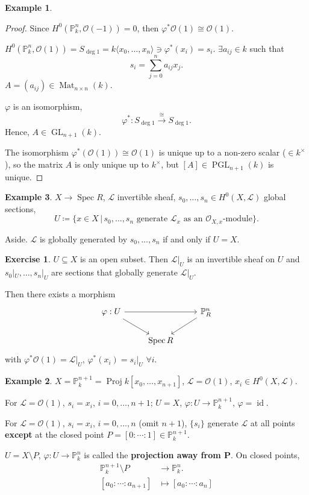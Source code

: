 \documentclass[12pt]{article}
\DeclareMathOperator{\id}{id}
\DeclareMathOperator{\Spec}{Spec}
\DeclareMathOperator{\Proj}{Proj}
\DeclareMathOperator{\GL}{GL}
\DeclareMathOperator{\PGL}{PGL}
\DeclareMathOperator{\Mat}{Mat}
\theoremstyle{definition}
\newtheorem*{exercise}{Exercise}
\newtheorem*{example}{Example}
\begin{document}
\begin{example}
\begin{proof}
Since $H^0(\mathbb P_k^n,\mathcal O(-1))=0$, then $\varphi^*\mathcal O(1)\cong\mathcal O(1)$.

$H^0(\mathbb P_k^n,\mathcal O(1))=S_{\deg1}=k\langle x_0,\ldots,x_n\rangle\ni\varphi^*(x_i)=s_i$. $\exists a_{ij}\in k$ such that
\[s_i=\sum_{j=0}^na_{ij}x_j.\]
$A=(a_{ij})\in\Mat_{n\times n}(k)$.

$\varphi$ is an isomorphism,
\[\varphi^*:S_{\deg1}\overset\cong\longrightarrow S_{\deg1}.\]
Hence, $A\in\GL_{n+1}(k)$.

The isomorphism $\varphi^*(\mathcal O(1))\cong\mathcal O(1)$ is unique up to a non-zero scalar ($\in k^\times$), so the matrix $A$ is only unique up to $k^\times$, but $[A]\in\PGL_{n+1}(k)$ is unique.
\end{proof}
\end{example}

\begin{example}
$X\rightarrow\Spec R$, $\mathcal L$ invertible sheaf, $s_0,\ldots,s_n\in H^0(X,\mathcal L)$ global sections,
\[U\coloneqq\{x\in X\,|\,s_0,\ldots,s_n\text{ generate }\mathcal L_x\text{ as an }\mathcal O_{X,x}\text{-module}\}.\]

Aside. $\mathcal L$ is globally generated by $s_0,\ldots,s_n$ if and only if $U=X$.

\begin{exercise}
$U\subseteq X$ is an open subset. Then $\mathcal L|_U$ is an invertible sheaf on $U$ and $s_0|_U,\ldots,s_n|_U$ are sections that globally generate $\mathcal L|_U$.

Then there exists a morphism
\[\begin{tikzcd}\varphi:U\arrow[rr]\arrow[rd]&&\mathbb P_R^n\arrow[ld]\\&\Spec R\end{tikzcd}\]
with $\varphi^*\mathcal O(1)=\mathcal L|_U$, $\varphi^*(x_i)=s_i|_U$ $\forall i$.
\end{exercise}

\begin{example}
$X=\mathbb P_k^{n+1}=\Proj k[x_0,\ldots,x_{n+1}]$, $\mathcal L=\mathcal O(1)$, $x_i\in H^0(X,\mathcal L)$.

For $\mathcal L=\mathcal O(1)$, $s_i=x_i$, $i=0,\ldots,n+1$; $U=X$, $\varphi:U\rightarrow\mathbb P_k^{n+1}$, $\varphi=\id$.
\end{example}

For $\mathcal L=\mathcal O(1)$, $s_i=x_i$, $i=0,\ldots,n$ (omit $n+1$), $\{s_i\}$ generate $\mathcal L$ at all points \textbf{except} at the closed point $P=[0:\cdots:1]\in\mathbb P_k^{n+1}$.

$U=X\setminus P$, $\varphi:U\rightarrow\mathbb P_k^n$ is called the \textbf{projection away from $\boldsymbol P$}. On closed points,
\begin{align*}
\mathbb P_k^{n+1}\setminus P&\longrightarrow\mathbb P_k^n.\\ [a_0:\cdots:a_{n+1}]&\longmapsto[a_0:\cdots:a_n]
\end{align*}
\end{example}
\end{document}
